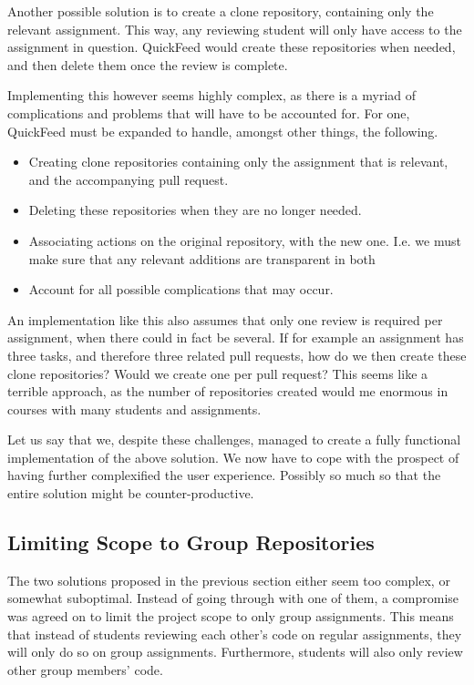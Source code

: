 Another possible solution is to create a clone repository, containing only the relevant assignment. 
This way, any reviewing student will only have access to the assignment in question.
QuickFeed would create these repositories when needed, and then delete them once the review is complete.

Implementing this however seems highly complex, as there is a myriad of complications and problems that will have to be accounted for.
For one, QuickFeed must be expanded to handle, amongst other things, the following.

\begin{itemize}
    \item Creating clone repositories containing only the assignment that is relevant, and the accompanying pull request.
    \item Deleting these repositories when they are no longer needed.
    \item Associating actions on the original repository, with the new one.
    I.e. we must make sure that any relevant additions are transparent in both
    \item Account for all possible complications that may occur.
\end{itemize}

An implementation like this also assumes that only one review is required per assignment, when there could in fact be several.
If for example an assignment has three tasks, and therefore three related pull requests, how do we then create these clone repositories?
Would we create one per pull request?
This seems like a terrible approach, as the number of repositories created would me enormous in courses with many students and assignments.

Let us say that we, despite these challenges, managed to create a fully functional implementation of the above solution.
We now have to cope with the prospect of having further complexified the user experience.
Possibly so much so that the entire solution might be counter-productive.

\subsection{Limiting Scope to Group Repositories}

The two solutions proposed in the previous section either seem too complex, or somewhat suboptimal.
Instead of going through with one of them, a compromise was agreed on to limit the project scope to only group assignments.
This means that instead of students reviewing each other's code on regular assignments, they will only do so on group assignments.
Furthermore, students will also only review other group members' code.

